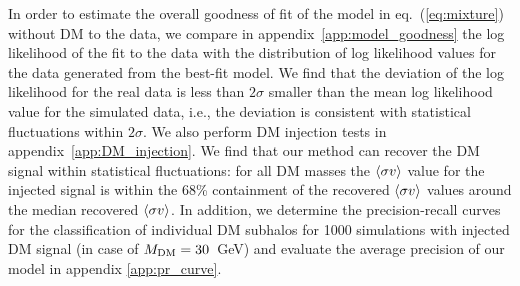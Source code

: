 {
In order to estimate the overall goodness of fit of the model in eq.~(\ref{eq:mixture}) without DM to the data,
we compare in appendix~\ref{app:model_goodness} the log likelihood of the fit to the data with the distribution of log likelihood values for the data generated from the best-fit model.
We find that the deviation of the log likelihood for the real data is less than $2\sigma$ smaller than the mean log likelihood value for the simulated data, i.e., the deviation is consistent with statistical fluctuations within $2\sigma$.
We also perform DM injection tests in appendix~\ref{app:DM_injection}.
We find that our method can recover the DM signal within statistical fluctuations: for all DM masses the  $\sigmav$ value for the injected signal is within the 68\% containment of the recovered $\sigmav$ values around the median recovered $\sigmav$.
}
{In addition, we determine the precision-recall curves for the classification of individual DM subhalos for 1000 simulations with injected DM signal (in case of ${M_\textrm{DM}} = 30$~GeV) and evaluate the average precision of our model in appendix \ref{app:pr_curve}.}


\begin{table}[t]
\centering
{}
\caption{
Expected number of DM subhalos ($N_{\rm sub}$) for the \textbf{best-fit model} and for the \textbf{95\% confidence upper bound} on the annihilation cross-section ($\sigmav$). In both cases, we report the subhalo count within our ROI and the total count. The test statistic difference quantifies the significance of the best-fit model over an astrophysical-only model, $\Delta {\rm TS}_0 = -2(\log\mathcal{L}_0 - \log\mathcal{L}_{\rm max})$. The number of subhalos, $N_{\rm sub}$, is constrained to be non-negative.
}
\label{tab:Nsub_values}
\end{table}



